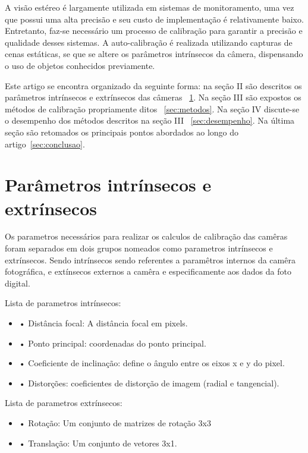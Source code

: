 \documentclass[portuguese]{sbrt}
\begin{document}
\newline
A visão estéreo é largamente utilizada em sistemas de monitoramento, uma vez que possui uma alta precisão e seu custo de implementação é relativamente baixo. Entretanto, faz-se necessário um processo de calibração para garantir a precisão e qualidade desses sistemas. A auto-calibração é realizada utilizando capturas de cenas estáticas, se que se altere os parâmetros intrínsecos da câmera, dispensando o uso de objetos conhecidos previamente.

\newline
Este artigo se encontra organizado da seguinte forma: na seção II são descritos os parâmetros intrínsecos e extrínsecos das câmeras ~\ref{sec:parametros}. Na seção III são expostos os métodos de calibração propriamente ditos ~\ref{sec:metodos}. Na seção IV discute-se o desempenho dos métodos descritos na seção III ~\ref{sec:desempenho}. Na última seção são retomados os principais pontos abordados ao longo do artigo~\ref{sec:conclusao}.
 

\section{Parâmetros intrínsecos e extrínsecos}
\label{sec:parametros}
Os parametros necessários para realizar os calculos de calibração das camêras foram separados em dois grupos nomeados como parametros intrínsecos e extrínsecos. Sendo intrínsecos sendo referentes a paramêtros internos da camêra fotográfica, e extínsecos externos a camêra e especificamente aos dados da foto digital.

\newline
Lista de parametros intrínsecos:
\begin{itemize}
    \item • Distância focal: A distância focal em pixels.
    \item • Ponto principal: coordenadas do ponto principal.
    \item • Coeficiente de inclinação: define o ângulo entre os eixos x e y do pixel.
    \item • Distorções: coeficientes de distorção de imagem (radial e tangencial).
\end{itemize}

\newline
Lista de parametros extrínsecos:
\begin{itemize}
    \item • Rotação: Um conjunto de matrizes de rotação 3x3
    \item • Translação: Um conjunto de vetores 3x1.
\end{itemize}
\end{document}
